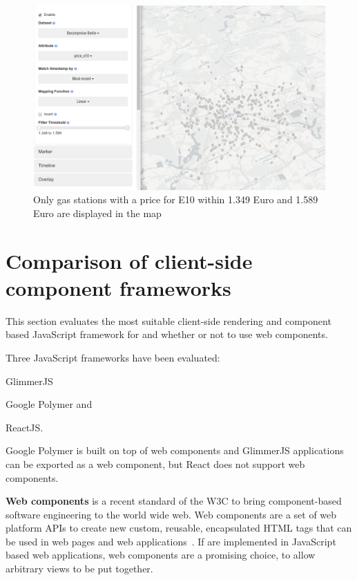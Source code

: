 \begin{figure}[h]
  \centering
  \includegraphics[width=\textwidth]{images/existing-interactions-filter.png}
  \caption{%
    Only gas stations with a price for E10 within 1.349 Euro and 1.589 Euro are displayed in the map
  }\label{fig:analysis:interaction:existing:filter}
\end{figure}

\section{Comparison of client-side component frameworks}\label{sec:analysis:frontend-framework-comparison}

This section evaluates the most suitable client-side rendering and component based JavaScript framework for \cmvs{} and whether or not to use web components.

Three JavaScript frameworks have been evaluated:
\begin{enumerate*}[label=(\arabic*)]
  \item GlimmerJS
  \item Google Polymer and
  \item ReactJS.
\end{enumerate*}
Google Polymer is built on top of web components and GlimmerJS applications can be exported as a web component, but React does not support web components.

\textbf{Web components} is a recent standard of the W3C\cite{W3C2017} to bring component-based software engineering to the world wide web.
Web components are a set of web platform APIs to create new custom, reusable, encapsulated HTML tags that can be used in web pages and web applications~\cite{WebComponents2017}.
If \cmvs{} are implemented in JavaScript based web applications, web components are a promising choice, to allow arbitrary views to be put together.


